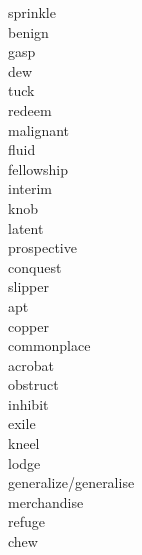\documentclass[b5paper, 11pt]{ctexart}
\begin{document}
\begin{multicols*}{3}
\begin{description}
\item[sprinkle]

\item[benign]

\item[gasp]

\item[dew]

\item[tuck]

\item[redeem]

\item[malignant]

\item[fluid]

\item[fellowship]

\item[interim]

\item[knob]

\item[latent]

\item[prospective]

\item[conquest]

\item[slipper]

\item[apt]

\item[copper]

\item[commonplace]

\item[acrobat]

\item[obstruct]

\item[inhibit]

\item[exile]

\item[kneel]

\item[lodge]

\item[generalize/generalise]

\item[merchandise]

\item[refuge]

\item[chew]


\end{description}
\end{multicols*}
\end{document}
